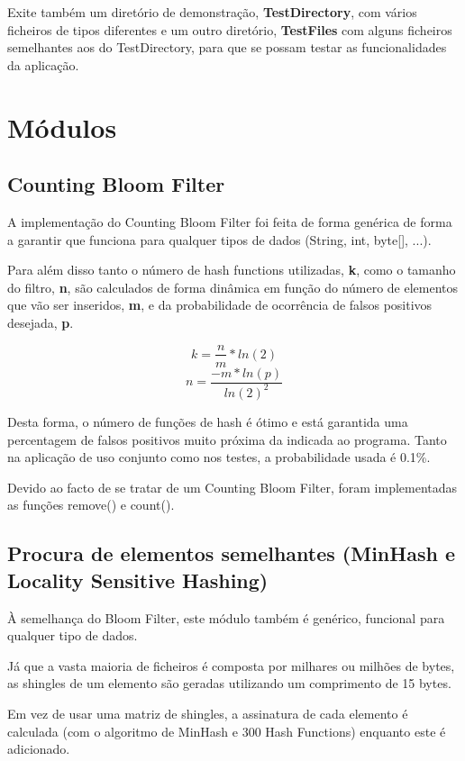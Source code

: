 \documentclass{report}
\begin{document}
\par
Exite também um diretório de demonstração, \textbf{TestDirectory}, com vários ficheiros de tipos diferentes e um outro diretório, \textbf{TestFiles} com alguns ficheiros semelhantes aos do TestDirectory, para que se possam testar as funcionalidades da aplicação.

\section{Módulos}

\subsection{Counting Bloom Filter}
A implementação do Counting Bloom Filter foi feita de forma genérica de forma a garantir que funciona para qualquer tipos de dados (String, int, byte[], ...).
\par
Para além disso tanto o número de hash functions utilizadas, \textbf{k}, como o tamanho do filtro, \textbf{n}, são calculados de forma dinâmica em função do número de elementos que vão ser inseridos, \textbf{m}, e da probabilidade de ocorrência de falsos positivos desejada, \textbf{p}.

\[ k = \frac{n}{m} * ln(2) \]
\[ n = \frac{-m*ln(p)}{ln(2)^2}  \]\newline

\par
Desta forma, o número de funções de hash é ótimo e está garantida uma percentagem de falsos positivos muito próxima da indicada ao programa. Tanto na aplicação de uso conjunto como nos testes, a probabilidade usada é 0.1\%.

\par
Devido ao facto de se tratar de um Counting Bloom Filter, foram implementadas as funções remove() e count().

\subsection{Procura de elementos semelhantes (MinHash e Locality Sensitive Hashing)}

À semelhança do Bloom Filter, este módulo também é genérico, funcional para qualquer tipo de dados.
\par
Já que a vasta maioria de ficheiros é composta por milhares ou milhões de bytes, as shingles de um elemento são geradas utilizando um comprimento de 15 bytes. 
\par
Em vez de usar uma matriz de shingles, a assinatura de cada elemento é calculada (com o algoritmo de MinHash e 300 Hash Functions) enquanto este é adicionado.
\end{document}
